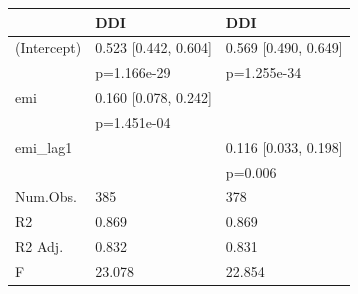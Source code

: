 \begin{tabular}{lll}
\hline
& DDI & DDI  \\ \hline
(Intercept) & 0.523 [0.442, 0.604] & 0.569 [0.490, 0.649] \\
& p=1.166e-29 & p=1.255e-34 \\
emi & 0.160 [0.078, 0.242] &  \\
& p=1.451e-04 &  \\
emi_lag1 &  & 0.116 [0.033, 0.198] \\
&  & p=0.006 \\
Num.Obs. & 385 & 378 \\
R2 & 0.869 & 0.869 \\
R2 Adj. & 0.832 & 0.831 \\
F & 23.078 & 22.854 \\
\hline
\end{tabular}
